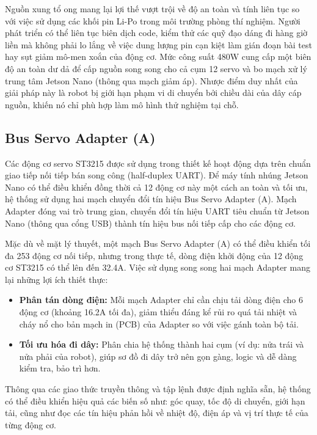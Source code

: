 Nguồn xung tổ ong mang lại lợi thế vượt trội về độ an toàn và tính liên tục so với việc sử dụng các khối pin Li-Po trong môi trường phòng thí nghiệm. Người phát triển có thể liên tục biên dịch code, kiểm thử các quỹ đạo dáng đi hàng giờ liền mà không phải lo lắng về việc dung lượng pin cạn kiệt làm gián đoạn bài test hay sụt giảm mô-men xoắn của động cơ. Mức công suất 480W cung cấp một biên độ an toàn  dư dả để cấp nguồn song song cho cả cụm 12 servo và bo mạch xử lý trung tâm Jetson Nano (thông qua mạch giảm áp). Nhược điểm duy nhất của giải pháp này là robot bị giới hạn phạm vi di chuyển bởi chiều dài của dây cáp nguồn, khiến nó chỉ phù hợp làm mô hình thử nghiệm tại chỗ.

\subsection{Bus Servo Adapter (A)}

Các động cơ servo ST3215 được sử dụng trong thiết kế hoạt động dựa trên chuẩn giao tiếp nối tiếp bán song công (half-duplex UART). Để máy tính nhúng Jetson Nano có thể điều khiển đồng thời cả 12 động cơ này một cách an toàn và tối ưu, hệ thống sử dụng hai mạch chuyển đổi tín hiệu Bus Servo Adapter (A). Mạch Adapter đóng vai trò trung gian, chuyển đổi tín hiệu UART tiêu chuẩn từ Jetson Nano (thông qua cổng USB) thành tín hiệu bus nối tiếp cấp cho các động cơ. 

Mặc dù về mặt lý thuyết, một mạch Bus Servo Adapter (A) có thể điều khiển tối đa 253 động cơ nối tiếp, nhưng trong thực tế, dòng điện khởi động của 12 động cơ ST3215 có thể lên đến 32.4A. Việc sử dụng song song hai mạch Adapter mang lại những lợi ích thiết thực:
\begin{itemize}
    \item \textbf{Phân tán dòng điện:} Mỗi mạch Adapter chỉ cần chịu tải dòng điện cho 6 động cơ (khoảng 16.2A tối đa), giảm thiểu đáng kể rủi ro quá tải nhiệt và cháy nổ cho bản mạch in (PCB) của Adapter so với việc gánh toàn bộ tải.
    \item \textbf{Tối ưu hóa đi dây:} Phân chia hệ thống thành hai cụm (ví dụ: nửa trái và nửa phải của robot), giúp sơ đồ đi dây trở nên gọn gàng, logic và dễ dàng kiểm tra, bảo trì hơn.
\end{itemize}

Thông qua các giao thức truyền thông và tập lệnh được định nghĩa sẵn, hệ thống có thể điều khiển hiệu quả các biến số như: góc quay, tốc độ di chuyển, giới hạn tải, cũng như đọc các tín hiệu phản hồi về nhiệt độ, điện áp và vị trí thực tế của từng động cơ.


